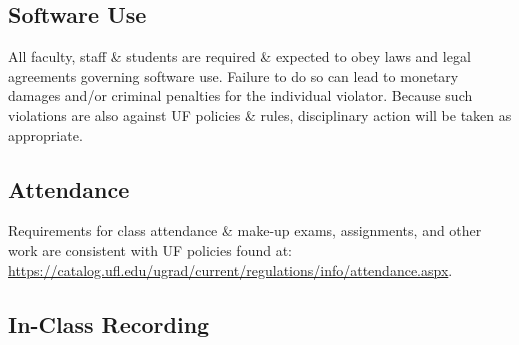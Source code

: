 \documentclass[
  10pt,
  letterpaper,
  oneside,
  open=any]{scrbook}
\begin{document}
\subsection*{Software Use}\label{software-use}

All faculty, staff \& students are required \& expected to obey laws and
legal agreements governing software use. Failure to do so can lead to
monetary damages and/or criminal penalties for the individual violator.
Because such violations are also against UF policies \& rules,
disciplinary action will be taken as appropriate.

\subsection*{Attendance}\label{attendance-1}

Requirements for class attendance \& make-up exams, assignments, and
other work are consistent with UF policies found at:
\url{https://catalog.ufl.edu/ugrad/current/regulations/info/attendance.aspx}.

\subsection*{In-Class Recording}\label{in-class-recording}
\end{document}
